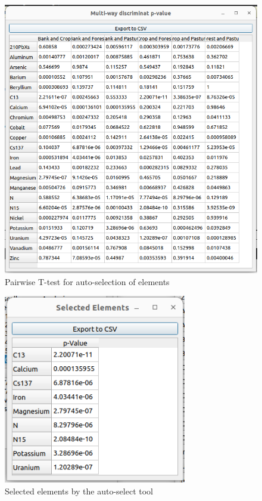 \documentclass[12pt]{report}
\begin{document}
\begin{figure}[ht]
    \centering
    \includegraphics[width=14cm]{Figures/Auto-Select-p-value.png} 
    \caption{Pairwise T-test for auto-selection of elements}
    \label{fig:autoselect-p-vals}
\end{figure}
\FloatBarrier

\begin{figure}[ht]
    \centering
    \includegraphics[width=8cm]{Figures/Autoselect-selectedelements.png} 
    \caption{Selected elements by the auto-select tool}
    \label{fig:autoselect-results}
\end{figure}
\FloatBarrier
\end{document}
